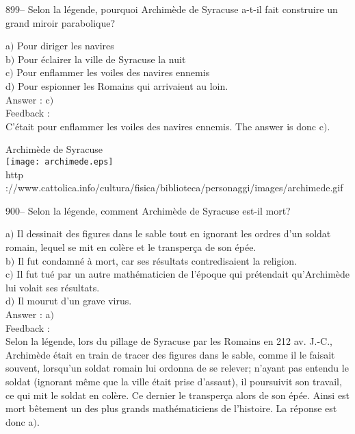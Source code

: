 ﻿\documentclass[letterpaper, 12pt]{article}
\begin{document}
899-- Selon la l\'egende, pourquoi Archim\`ede de Syracuse a-t-il
fait construire un grand miroir parabolique?

a$)$ Pour diriger les navires \\
b$)$ Pour \'eclairer la ville de Syracuse la nuit \\
c$)$ Pour enflammer les voiles des navires ennemis \\
d$)$ Pour espionner les Romains qui arrivaient au loin.\\

Answer : c$)$\\

Feedback : \\
C'\'etait pour enflammer les voiles des navires ennemis. The answer is
donc c$)$.\\

        \begin{center}
        Archim\`ede de Syracuse\\
    \texttt{[image: archimede.eps]}\\
        {\footnotesize http
://www.cattolica.info/cultura/fisica/biblioteca/personaggi/images/archimede.gif}
    \end{center}

900-- Selon la l\'egende, comment Archim\`ede de Syracuse est-il
mort?

a$)$ Il dessinait des figures dans le sable tout en ignorant les ordres d'un
soldat romain, lequel se mit en col\`ere
et le transper\c ca de son \'ep\'ee. \\
b$)$ Il fut condamn\'e \`a mort, car ses r\'esultats contredisaient la
religion. \\
c$)$ Il fut tu\'e par un autre math\'ematicien de l'\'epoque qui
pr\'etendait qu'Archim\`ede lui volait ses r\'esultats. \\
d$)$ Il mourut d'un grave virus.\\

Answer : a$)$\\

Feedback :\\
Selon la l\'egende, lors du pillage de Syracuse par les Romains en
212 av. J.-C., Archim\`ede \'etait en train de tracer des figures
dans le sable, comme il le faisait souvent, lorsqu'un soldat romain
lui ordonna de se relever; n'ayant pas entendu le soldat (ignorant
m\^eme que la ville \'etait prise d'assaut), il poursuivit son
travail, ce qui mit le soldat en col\`ere. Ce dernier le transper\c
ca alors de son \'ep\'ee. Ainsi est mort
b\^etement un des plus grands math\'ematiciens de l'histoire. La r\'eponse
est donc a$)$.\\
\end{document}
